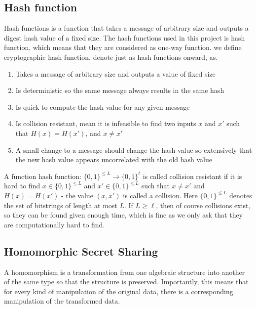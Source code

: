 \subsection{Hash function}
Hash functions is a function that takes a message of arbitrary size and outputs a digest hash value of a fixed size. The hash functions used in this project is hash function, which means that they are considered as one-way function. we define cryptographic hash function, denote just as hash functions onward, as.

\begin{defi}
\begin{enumerate}
    \item Takes a message of arbitrary size and outputs a value of fixed size
    \item Is deterministic so the same message always results in the same hash
    \item Is quick to compute the hash value for any given message
    \item Is collision resistant, mean it is infeasible to find two inputs $x$ and $x'$ such that $H(x) = H(x')$, and $x \neq x'$
    \item A small change to a message should change the hash value so extensively that the new hash value appears uncorrelated with the old hash value
\end{enumerate}
\end{defi}

A function hash function: $\{0,1\}^{\leq L} \rightarrow \{0,1\}^\ell$ is called collision resistant if it is hard to find $x \in \{0,1\}^{\leq L}$ and $x' \in \{0,1\}^{\leq L}$ such that $x \neq x'$ and $H(x)=H(x')$ - the value $(x,x')$ is called a collision. Here $\{0,1\}^{\leq L}$ denotes the set of bitstrings of length at most $L$. If $L \geq \ell$, then of course collisions exist, so they can be found given enough time, which is fine as we only ask that they are computationally hard to find.  

\subsection{Homomorphic Secret Sharing}
A homomorphism is a transformation from one algebraic structure into another of the same type so that the structure is preserved. Importantly, this means that for every kind of manipulation of the original data, there is a corresponding manipulation of the transformed data.\\

